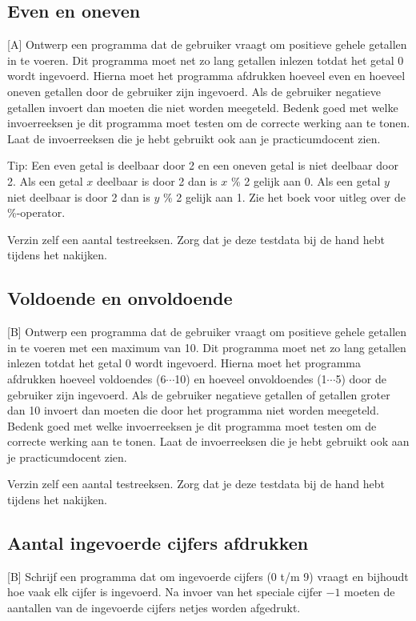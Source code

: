 \documentclass[a4paper,10pt,fleqn,twoside]{article}
\begin{document}
\subsection{Even en oneven}[A]
Ontwerp een programma dat de gebruiker vraagt om positieve gehele getallen in te voeren. Dit programma moet net zo lang getallen inlezen totdat het getal 0 wordt ingevoerd. Hierna moet het programma afdrukken hoeveel even en hoeveel oneven getallen door de gebruiker zijn ingevoerd. Als de gebruiker negatieve getallen invoert dan moeten die niet worden meegeteld. Bedenk goed met welke invoerreeksen je dit programma moet testen om de correcte werking aan te tonen. Laat de invoerreeksen die je hebt gebruikt ook aan je practicumdocent zien.

Tip: Een even getal is deelbaar door 2 en een oneven getal is niet deelbaar door 2. Als een getal $x$ deelbaar is door 2 dan is $x$ \% 2 gelijk aan 0. Als een getal $y$ niet deelbaar is door 2 dan is $y$ \% 2 gelijk aan 1. Zie het boek voor uitleg over de \%-operator.

Verzin zelf een aantal testreeksen. Zorg dat je deze testdata bij de hand hebt tijdens het nakijken.

\subsection{Voldoende en onvoldoende}[B]
Ontwerp een programma dat de gebruiker vraagt om positieve gehele getallen in te voeren met een maximum van 10. Dit programma moet net zo lang getallen inlezen totdat het getal 0 wordt ingevoerd. Hierna moet het programma afdrukken hoeveel voldoendes (6$\cdots$10) en hoeveel onvoldoendes (1$\cdots$5) door de gebruiker zijn ingevoerd. Als de gebruiker negatieve getallen of getallen groter dan 10 invoert dan moeten die door het programma niet worden meegeteld. Bedenk goed met welke invoerreeksen je dit programma moet testen om de correcte werking aan te tonen. Laat de invoerreeksen die je hebt gebruikt ook aan je practicumdocent zien.

Verzin zelf een aantal testreeksen. Zorg dat je deze testdata bij de hand hebt tijdens het nakijken.

\subsection{Aantal ingevoerde cijfers afdrukken}[B]
Schrijf een programma dat om ingevoerde cijfers (0 t/m 9) vraagt en bijhoudt hoe vaak elk cijfer is ingevoerd. Na invoer van het speciale cijfer $-1$ moeten de aantallen van de ingevoerde cijfers netjes worden afgedrukt.
\end{document}
